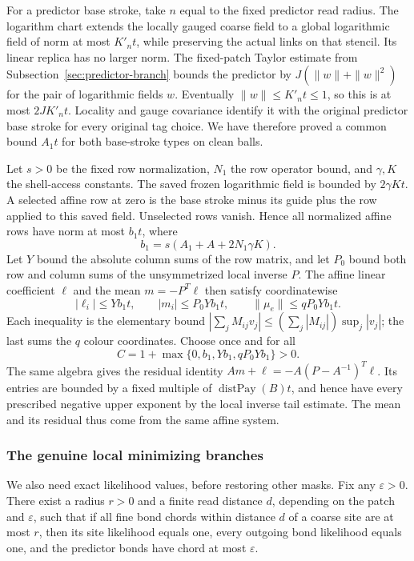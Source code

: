 For a predictor base stroke, take $n$ equal to the fixed predictor
read radius. The logarithm chart extends the locally gauged coarse
field to a global logarithmic field of norm at most $K'_nt$, while
preserving the actual links on that stencil. Its linear replica has
no larger norm. The fixed-patch Taylor estimate from
Subsection~\ref{sec:predictor-branch} bounds the predictor by
$J(\|w\|+\|w\|^2)$ for the pair of logarithmic fields $w$.
Eventually $\|w\|\le K'_nt\le1$, so this is at most $2JK'_nt$.
Locality and gauge covariance identify it with the original predictor
base stroke for every original tag choice. We have therefore proved
a common bound $A_1t$ for both base-stroke types on clean balls.

Let $s>0$ be the fixed row normalization, $N_1$ the row operator
bound, and $\gamma,K$ the shell-access constants. The saved frozen
logarithmic field is bounded by $2\gamma Kt$. A selected affine row
at zero is the base stroke minus its guide plus the row applied to
this saved field. Unselected rows vanish. Hence all normalized affine
rows have norm at most $b_1t$, where
\[
                  b_1=s(A_1+A+2N_1\gamma K).
\]
Let $Y$ bound the absolute column sums of the row matrix, and let
$P_0$ bound both row and column sums of the unsymmetrized local inverse
$P$. The affine linear coefficient $\ell$ and the mean $m=-P^T\ell$
then satisfy coordinatewise
\[
                    |\ell_i|\le Yb_1t,
       \qquad |m_i|\le P_0Yb_1t,
       \qquad \|\mu_e\|\le qP_0Yb_1t.
\]
Each inequality is the elementary bound
$|\sum_jM_{ij}v_j|\le(\sum_j|M_{ij}|)\sup_j|v_j|$;
the last sums the $q$ colour coordinates. Choose once and for all
\begin{equation}\label{eq:safety-mean-cap}
                    C=1+\max\{0,b_1,Yb_1,qP_0Yb_1\}>0.
\end{equation}
The same algebra gives the residual identity
$Am+\ell=-A(P-A^{-1})^T\ell$. Its entries are bounded by a
fixed multiple of $\operatorname{distPay}(B)t$, and hence have every
prescribed negative upper exponent by the local inverse tail estimate.
The mean and its residual thus come from the same affine system.

\subsubsection{The genuine local minimizing branches}
We also need exact likelihood values, before restoring other masks.
Fix any $\varepsilon>0$. There exist a radius $r>0$ and a finite
read distance $d$, depending on the patch and $\varepsilon$, such that
if all fine bond chords within distance $d$ of a coarse site are at
most $r$, then its site likelihood equals one, every outgoing bond
likelihood equals one, and the predictor bonds have chord at most
$\varepsilon$.


